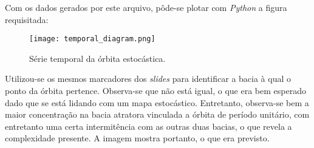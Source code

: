 \documentclass{article}[twocolumn]
\begin{document}
	Com os dados gerados por este arquivo, p\^ode-se plotar com \textit{Python} a figura
	requisitada:
	\begin{figure}[H]
		\centering
		\texttt{[image: temporal\_diagram.png]}
		\caption{S\'erie temporal da \'orbita estoc\'astica.}
	\end{figure}
	Utilizou-se os mesmos marcadores dos \textit{slides}  para identificar a bacia \`a
	qual o ponto da \'orbita pertence. Observa-se que n\~ao est\'a igual, o que era bem esperado
	dado que se est\'a lidando com um mapa estoc\'astico. Entretanto, observa-se bem a maior
	concentra\c{c}\~ao na bacia atratora vinculada a \'orbita de per\'iodo unit\'ario, com
	entretanto uma certa intermit\^encia com as outras duas bacias, o que revela a complexidade
	presente. A imagem mostra portanto, o que era previsto.
\end{document}
